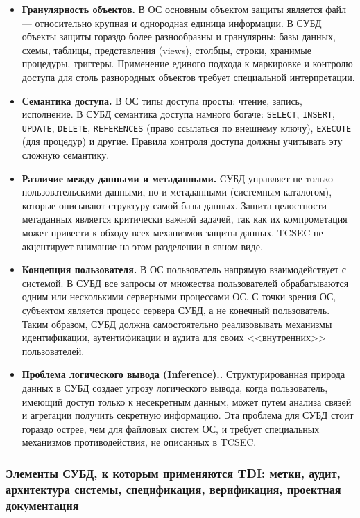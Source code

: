 \begin{itemize}
	\item \textbf{Гранулярность объектов.} В ОС основным объектом защиты является файл --- относительно крупная и однородная единица информации. В СУБД объекты защиты гораздо более разнообразны и гранулярны: базы данных, схемы, таблицы, представления (views), столбцы, строки, хранимые процедуры, триггеры. Применение единого подхода к маркировке и контролю доступа для столь разнородных объектов требует специальной интерпретации.
	\item \textbf{Семантика доступа.} В ОС типы доступа просты: чтение, запись, исполнение. В СУБД семантика доступа намного богаче: \texttt{SELECT}, \texttt{INSERT}, \texttt{UPDATE}, \texttt{DELETE}, \texttt{REFERENCES} (право ссылаться по внешнему ключу), \texttt{EXECUTE} (для процедур) и другие. Правила контроля доступа должны учитывать эту сложную семантику.
	\item \textbf{Различие между данными и метаданными.} СУБД управляет не только пользовательскими данными, но и метаданными (системным каталогом), которые описывают структуру самой базы данных. Защита целостности метаданных является критически важной задачей, так как их компрометация может привести к обходу всех механизмов защиты данных. TCSEC не акцентирует внимание на этом разделении в явном виде.
	\item \textbf{Концепция пользователя.} В ОС пользователь напрямую взаимодействует с системой. В СУБД все запросы от множества пользователей обрабатываются одним или несколькими серверными процессами ОС. С точки зрения ОС, субъектом является процесс сервера СУБД, а не конечный пользователь. Таким образом, СУБД должна самостоятельно реализовывать механизмы идентификации, аутентификации и аудита для своих <<внутренних>> пользователей.
	\item \textbf{Проблема логического вывода (Inference)..} Структурированная природа данных в СУБД создает угрозу логического вывода, когда пользователь, имеющий доступ только к несекретным данным, может путем анализа связей и агрегации получить секретную информацию. Эта проблема для СУБД стоит гораздо острее, чем для файловых систем ОС, и требует специальных механизмов противодействия, не описанных в TCSEC.
\end{itemize}

\subsubsection{Элементы СУБД, к которым применяются TDI: метки, аудит, архитектура системы, спецификация, верификация, проектная документация}

